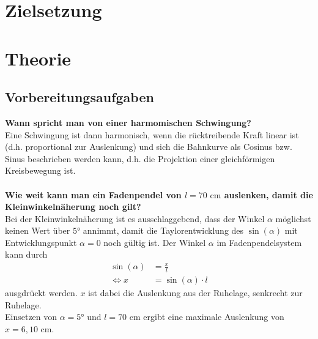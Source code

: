 \section{Zielsetzung}
\label{sec:Zielsetzung}

\section{Theorie}
\label{sec:Theorie}

\subsection{Vorbereitungsaufgaben}
\label{sec:Vorbereitungsaufgaben}
\textbf{Wann spricht man von einer harmomischen Schwingung?}\\
Eine Schwingung ist dann harmonisch, wenn die rücktreibende Kraft linear ist (d.h. proportional zur Auslenkung) und sich die Bahnkurve als 
Cosinus bzw. Sinus beschrieben werden kann, d.h. die Projektion einer gleichförmigen Kreisbewegung ist. 
\\
\\
\textbf{Wie weit kann man ein Fadenpendel von $l = 70 \,\,\unit{\centi\meter}$ auslenken, damit die Kleinwinkelnäherung noch gilt?}\\
Bei der Kleinwinkelnäherung ist es ausschlaggebend, dass der Winkel $\alpha$ möglichst keinen Wert über $5°$ annimmt, 
damit die Taylorentwicklung des $\sin(\alpha)$ mit Entwicklungspunkt $\alpha = 0$ noch gültig ist. 
Der Winkel $\alpha$ im Fadenpendelsystem kann durch
\begin{align}
    \sin(\alpha) &= \frac{x}{l} \\
    \Leftrightarrow x &= \sin(\alpha) \cdot l
\end{align}
ausgdrückt werden. $x$ ist dabei die Auslenkung aus der Ruhelage, senkrecht zur Ruhelage. \\
Einsetzen von $\alpha = 5°$ und $l = 70 \,\, \unit{\centi\meter}$ ergibt eine maximale Auslenkung von $x = 6,10 \,\, \unit{\centi\meter}$. 
